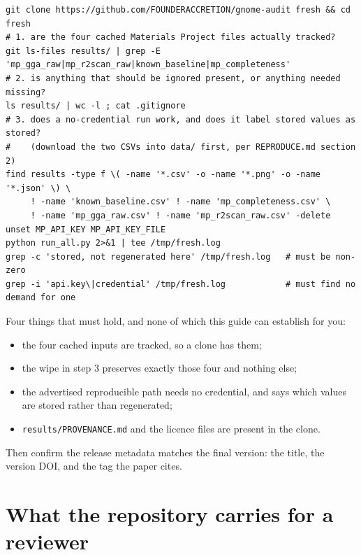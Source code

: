 \documentclass[11pt]{article}
\begin{document}
\begin{Verbatim}[fontsize=\small,frame=single]
git clone https://github.com/FOUNDERACCRETION/gnome-audit fresh && cd fresh
# 1. are the four cached Materials Project files actually tracked?
git ls-files results/ | grep -E 'mp_gga_raw|mp_r2scan_raw|known_baseline|mp_completeness'
# 2. is anything that should be ignored present, or anything needed missing?
ls results/ | wc -l ; cat .gitignore
# 3. does a no-credential run work, and does it label stored values as stored?
#    (download the two CSVs into data/ first, per REPRODUCE.md section 2)
find results -type f \( -name '*.csv' -o -name '*.png' -o -name '*.json' \) \
     ! -name 'known_baseline.csv' ! -name 'mp_completeness.csv' \
     ! -name 'mp_gga_raw.csv' ! -name 'mp_r2scan_raw.csv' -delete
unset MP_API_KEY MP_API_KEY_FILE
python run_all.py 2>&1 | tee /tmp/fresh.log
grep -c 'stored, not regenerated here' /tmp/fresh.log   # must be non-zero
grep -i 'api.key\|credential' /tmp/fresh.log            # must find no demand for one
\end{Verbatim}

Four things that must hold, and none of which this guide can establish for you:

\begin{itemize}[nosep]
\item the four cached inputs are tracked, so a clone has them;
\item the wipe in step 3 preserves exactly those four and nothing else;
\item the advertised reproducible path needs no credential, and says which values are
      stored rather than regenerated;
\item \texttt{results/PROVENANCE.md} and the licence files are present in the clone.
\end{itemize}

Then confirm the release metadata matches the final version: the title, the version DOI, and
the tag the paper cites.

\section{What the repository carries for a reviewer}
\end{document}
